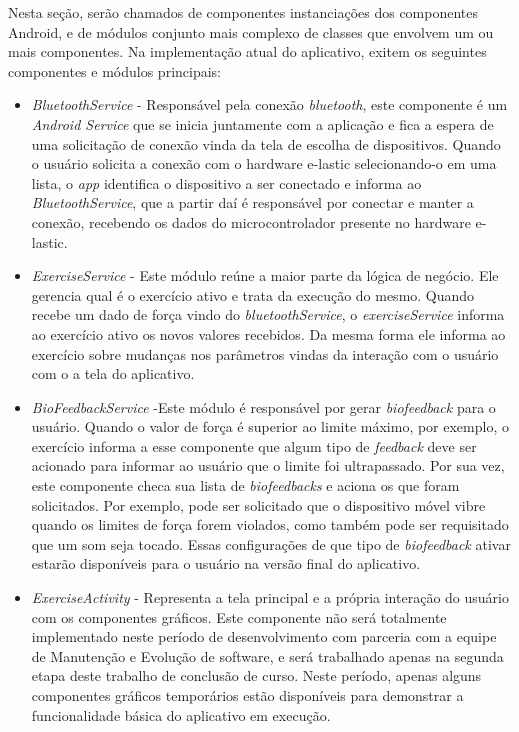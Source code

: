 Nesta seção, serão chamados de componentes instanciações dos componentes Android, e de módulos conjunto mais complexo de classes que envolvem um ou mais componentes. Na implementação atual do aplicativo, exitem os seguintes componentes e módulos principais:
\begin{itemize}
	\item \textit{BluetoothService} - Responsável pela conexão \textit{bluetooth}, este componente é um \textit{Android Service} que se inicia juntamente com a aplicação e fica a espera de uma solicitação de conexão vinda da tela de escolha de dispositivos. Quando o usuário solicita a conexão com o hardware e-lastic selecionando-o em uma lista, o \textit{app} identifica o dispositivo a ser conectado e informa ao \textit{BluetoothService}, que a partir daí é responsável por conectar e manter a conexão, recebendo os dados do microcontrolador presente no hardware e-lastic.
	\item \textit{ExerciseService} - Este módulo reúne a maior parte da lógica de negócio. Ele gerencia qual é o exercício ativo e trata da execução do mesmo. Quando recebe um dado de força vindo do \textit{bluetoothService}, o \textit{exerciseService} informa ao exercício ativo os novos valores recebidos. Da mesma forma ele informa ao exercício sobre mudanças nos parâmetros vindas da interação com o usuário com o a tela do aplicativo.
	\item \textit{BioFeedbackService} -Este módulo é responsável por gerar \textit{biofeedback} para o usuário. Quando o valor de força é superior ao limite máximo, por exemplo, o exercício informa a esse componente que algum tipo de \textit{feedback} deve ser acionado para informar ao usuário que o limite foi ultrapassado. Por sua vez, este componente checa sua lista de \textit{biofeedbacks} e aciona os que foram solicitados. Por exemplo, pode ser solicitado que o dispositivo móvel vibre quando os limites de força forem violados, como também pode ser requisitado que um som seja tocado. Essas configurações de que tipo de \textit{biofeedback} ativar estarão disponíveis para o usuário na versão final do aplicativo.  
	\item \textit{ExerciseActivity} - Representa a tela principal e a própria interação do usuário com os componentes gráficos. Este componente não será totalmente implementado neste período de desenvolvimento com parceria com a equipe de Manutenção e Evolução de software, e será trabalhado apenas na segunda etapa deste trabalho de conclusão de curso. Neste período, apenas alguns componentes gráficos temporários estão disponíveis para demonstrar a funcionalidade básica do aplicativo em execução.
\end{itemize} 


